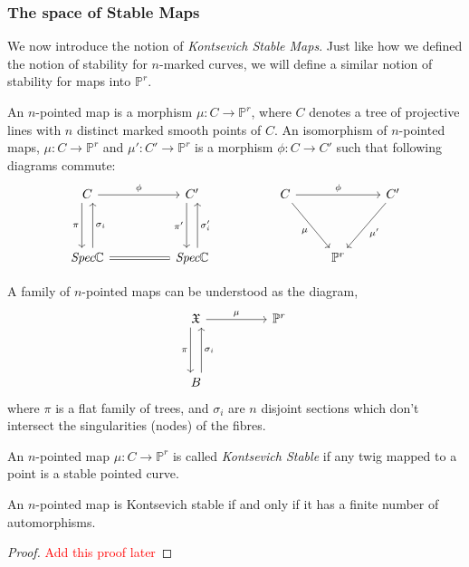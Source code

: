 \subsubsection{The space of Stable Maps}
We now introduce the notion of \textit{Kontsevich Stable Maps}.
Just like how we defined the notion of stability for $n$-marked curves, we will define a similar notion of stability for maps into $\mathbb{P}^{r}$.
\begin{definition}
    An $n$-pointed map is a morphism $\mu : C \to \mathbb{P}^{r}$, where $C$ denotes a tree of projective lines with $n$ distinct marked smooth points of $C$.
    An isomorphism of $n$-pointed maps, $\mu : C \to \mathbb{P}^{r}$ and $\mu' : C' \to \mathbb{P}^{r}$ is a morphism $\phi : C \to C'$ such that following diagrams commute:
\[
    \begin{tikzcd}
        C & & C' & & C & & C' \\
        \\
        \emph{Spec}\mathbb{C} & & \emph{Spec}\mathbb{C} & & & \mathbb{P}^{r} & 
        \arrow["\phi", from = 1-1, to = 1-3]
        \arrow["\phi", from = 1-5, to = 1-7]
        \arrow[swap,"\mu", from = 1-5, to = 3-6]
        \arrow["\mu'", from = 1-7, to = 3-6]
        \arrow[swap,"\pi", from = 1-1, to = 3-1, xshift = -1ex]
        \arrow[swap,"\pi'", from = 1-3, to = 3-3, xshift = -1ex]
        \arrow[equal, from = 3-1, to = 3-3]
        \arrow[swap,"\sigma_{i}", from = 3-1, to = 1-1, xshift = 1ex]
        \arrow[swap,"\sigma'_{i}", from = 3-3, to = 1-3, xshift = 1ex]
    \end{tikzcd}
\]
\end{definition}
A family of $n$-pointed maps can be understood as the diagram,
\[
    \begin{tikzcd}
        \mathfrak{X} & & \mathbb{P}^{r}\\
        \\
        B & &
        \arrow["\mu", from = 1-1, to = 1-3]
        \arrow[swap, "\pi", from = 1-1, to = 3-1, xshift = -1ex]
        \arrow[swap, "\sigma_{i}", from = 3-1, to = 1-1, xshift = 1ex]
    \end{tikzcd}
\]
where $\pi$ is a flat family of trees, and $\sigma_{i}$ are $n$ disjoint sections which don't intersect the singularities (nodes) of the fibres.
\begin{definition}
    An $n$-pointed map $\mu : C \to \mathbb{P}^{r}$ is called \textit{Kontsevich Stable} if any twig mapped to a point is a stable pointed curve.
\end{definition}
\begin{lemma}
    An $n$-pointed map is Kontsevich stable if and only if it has a finite number of automorphisms.
\end{lemma}
\begin{proof}
    \textcolor{red}{Add this proof later}
\end{proof}

